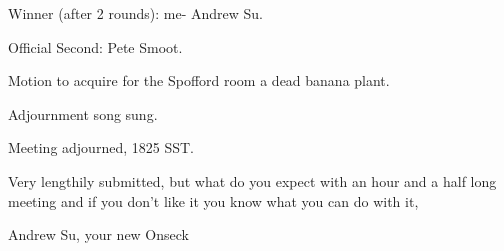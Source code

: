 \documentclass[12pt]{article}
\begin{document}
Winner (after 2 rounds): me- Andrew Su.

Official Second: Pete Smoot.

Motion to acquire for the Spofford room a dead banana plant.

Adjournment song sung.

\vspace{12pt}

\noindent
Meeting adjourned, 1825 SST.

\vspace{18pt}

\centerline{Very lengthily submitted, but what do you expect with an hour and a half long meeting and if you don't like it you know what you can do with it,}
\centerline{Andrew Su, your new Onseck}
\end{document}
